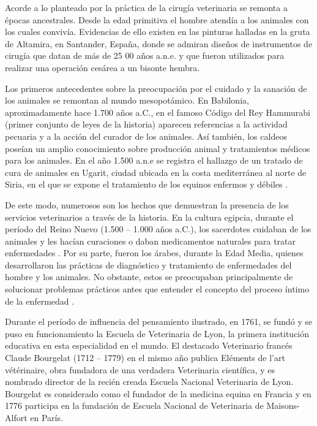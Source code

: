 Acorde a lo planteado por  la práctica de la cirugía veterinaria se remonta a épocas ancestrales. Desde la edad primitiva el hombre atendía a los animales con los cuales convivía. Evidencias de ello existen en las pinturas halladas en la gruta de Altamira, en Santander, España, donde se admiran diseños de instrumentos de cirugía que datan de más de 25 00 años a.n.e. y que fueron utilizados para realizar una operación cesárea a un bisonte hembra.   

Los primeros antecedentes sobre la preocupación por el cuidado y la sanación de los animales se remontan al mundo mesopotámico. En Babilonia, aproximadamente hace 1.700 años a.C., en el famoso Código del Rey Hammurabi (primer conjunto de leyes de la historia) aparecen referencias a la actividad pecuaria y a la acción del curador de los animales. Así también, los caldeos poseían un amplio conocimiento sobre producción animal y tratamientos médicos para los animales. En el año 1.500 a.n.e se registra el hallazgo de un tratado de cura de animales en Ugarit, ciudad ubicada en la costa mediterránea al norte de Siria, en el que se expone el tratamiento de los equinos enfermos y débiles . 

De este modo, numerosos son los hechos que demuestran la presencia de los servicios veterinarios a través de la historia. En la cultura egipcia, durante el período del Reino Nuevo (1.500 – 1.000 años a.C.), los sacerdotes cuidaban de los animales y les hacían curaciones o daban medicamentos naturales para tratar enfermedades . Por su parte, fueron los árabes, durante la Edad Media, quienes desarrollaron las prácticas de diagnóstico y tratamiento de enfermedades del hombre y los animales. No obstante, estos se preocupaban principalmente de solucionar problemas prácticos antes que entender el concepto del proceso íntimo de la enfermedad .  

Durante el período de influencia del pensamiento ilustrado, en 1761, se fundó y se puso en funcionamiento la Escuela de Veterinaria de Lyon, la primera institución educativa en esta especialidad en el mundo. El destacado Veterinario francés Claude Bourgelat (1712 – 1779) en el mismo año publica Eléments de l’art vétérinaire, obra fundadora de una verdadera Veterinaria científica, y es nombrado director de la recién creada Escuela Nacional Veterinaria de Lyon. Bourgelat es considerado como el fundador de la medicina equina en Francia y en 1776 participa en la fundación de Escuela Nacional de Veterinaria de Maisons-Alfort en París.  

